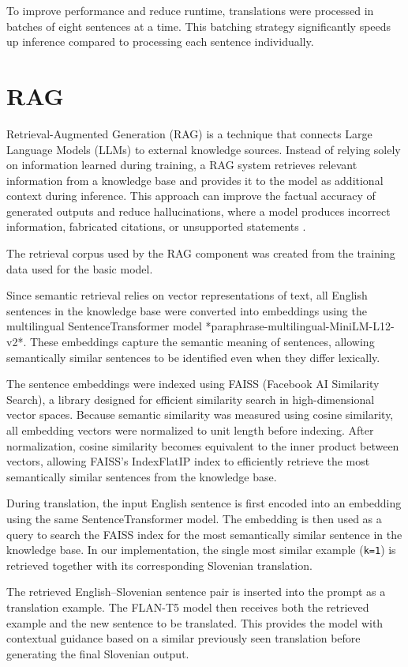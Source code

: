 \documentclass[fleqn,moreauthors,10pt]{ds_report}
\begin{document}
To improve performance and reduce runtime, translations were processed in batches of eight sentences at a time. This batching strategy significantly speeds up inference compared to processing each sentence individually.


\section*{RAG}
Retrieval-Augmented Generation (RAG) is a technique that connects Large Language Models (LLMs) to external knowledge sources. Instead of relying solely on information learned during training, a RAG system retrieves relevant information from a knowledge base and provides it to the model as additional context during inference. This approach can improve the factual accuracy of generated outputs and reduce hallucinations, where a model produces incorrect information, fabricated citations, or unsupported statements \cite{lewis2020rag, ibm_rag}.

The retrieval corpus used by the RAG component was created from the training data used for the basic model.

Since semantic retrieval relies on vector representations of text, all English sentences in the knowledge base were converted into embeddings using the multilingual SentenceTransformer model *paraphrase-multilingual-MiniLM-L12-v2*. These embeddings capture the semantic meaning of sentences, allowing semantically similar sentences to be identified even when they differ lexically.
 
The sentence embeddings were indexed using FAISS (Facebook AI Similarity Search), a library designed for efficient similarity search in high-dimensional vector spaces. 
Because semantic similarity was measured using cosine similarity, all embedding vectors were normalized to unit length before indexing. After normalization, cosine similarity becomes equivalent to the inner product between vectors, allowing FAISS's IndexFlatIP index to efficiently retrieve the most semantically similar sentences from the knowledge base.


During translation, the input English sentence is first encoded into an embedding using the same SentenceTransformer model. The embedding is then used as a query to search the FAISS index for the most semantically similar sentence in the knowledge base. In our implementation, the single most similar example (\texttt{k=1}) is retrieved together with its corresponding Slovenian translation.

The retrieved English–Slovenian sentence pair is inserted into the prompt as a translation example. The FLAN-T5 model then receives both the retrieved example and the new sentence to be translated. This provides the model with contextual guidance based on a similar previously seen translation before generating the final Slovenian output.
\end{document}
